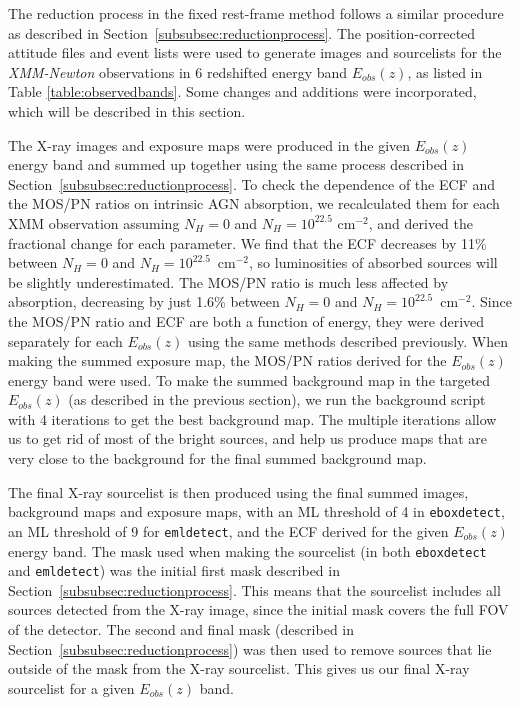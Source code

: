 \documentclass[fleqn,usenatbib]{mnras}
\begin{document}
        The reduction process in the fixed rest-frame method follows a similar procedure as described in Section~\ref{subsubsec:reductionprocess}.
        The position-corrected attitude files and event lists were used to generate images and sourcelists for the \textit{XMM-Newton} observations in 6 redshifted energy band $E_{obs}(z)$, as listed in Table \ref{table:observedbands}. 
        Some changes and additions were incorporated, which will be described in this section. 
        
        The X-ray images and exposure maps were produced in the given $E_{obs}(z)$ energy band and summed up together using the same process described in Section~\ref{subsubsec:reductionprocess}. 
    	To check the dependence of the ECF and the MOS/PN ratios on intrinsic AGN absorption, we recalculated them for each XMM observation assuming $N_{H} = 0$ and $N_{H} = 10^{22.5}$ cm$^{-2}$, and derived the fractional change for each parameter.
            We find that the ECF decreases by 11\% between $N_{H} = 0$ and $N_{H}=10^{22.5}$~cm$^{-2}$, so luminosities of absorbed sources will be slightly underestimated. 
            The MOS/PN ratio is much less affected by absorption, decreasing by just 1.6\% between $N_{H} = 0$ and $N_{H}=10^{22.5}$~cm$^{-2}$.
    	Since the MOS/PN ratio and ECF are both a function of energy, they were derived separately for each $E_{obs}(z)$ using the same methods described previously. 
    	When making the summed exposure map, the MOS/PN ratios derived for the $E_{obs}(z)$ energy band were used. 
    	To make the summed background map in the targeted $E_{obs}(z)$ (as described in the previous section), we run the background script with 4 iterations to get the best background map.
    	The multiple iterations allow us to get rid of most of the bright sources, and help us produce maps that are very close to the background for the final summed background map.

        The final X-ray sourcelist is then produced using the final summed images, background maps and exposure maps, with an ML threshold of 4 in \texttt{eboxdetect}, an ML threshold of 9 for \texttt{emldetect}, and the ECF derived for the given $E_{obs}(z)$ energy band. 
        The mask used when making the sourcelist (in both \texttt{eboxdetect} and \texttt{emldetect}) was the initial first mask described in Section~\ref{subsubsec:reductionprocess}.
        This means that the sourcelist includes all sources detected from the X-ray image, since the initial mask covers the full FOV of the detector. 
        The second and final mask (described in Section~\ref{subsubsec:reductionprocess}) was then used to remove sources that lie outside of the mask from the X-ray sourcelist.
        This gives us our final X-ray sourcelist for a given $E_{obs}(z)$ band.
\end{document}
